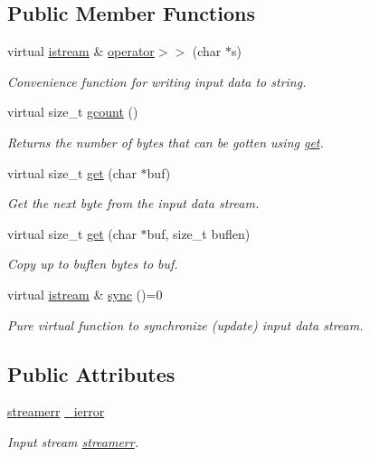 \subsection*{Public Member Functions}
\begin{DoxyCompactItemize}
\item 
virtual \hyperlink{classuio_1_1istream}{istream} \& \hyperlink{classuio_1_1istream_ac98975f13fe7d94de24ce9e9073daaae}{operator$>$$>$} (char $\ast$s)
\begin{DoxyCompactList}\small\item\em Convenience function for writing input data to {\ttfamily string}. \end{DoxyCompactList}\item 
virtual size\+\_\+t \hyperlink{classuio_1_1istream_ac351e3f745e1e10d1d4f999ba097222a}{gcount} ()
\begin{DoxyCompactList}\small\item\em Returns the number of bytes that can be gotten using \hyperlink{classuio_1_1istream_a2cd3af4694dd6680a16221a8e77a344b}{get}. \end{DoxyCompactList}\item 
virtual size\+\_\+t \hyperlink{classuio_1_1istream_a2cd3af4694dd6680a16221a8e77a344b}{get} (char $\ast$buf)
\begin{DoxyCompactList}\small\item\em Get the next byte from the input data stream. \end{DoxyCompactList}\item 
virtual size\+\_\+t \hyperlink{classuio_1_1istream_a12e8ae6afd488b62e216333dbb0935cc}{get} (char $\ast$buf, size\+\_\+t buflen)
\begin{DoxyCompactList}\small\item\em Copy up to {\itshape buflen} bytes to {\itshape buf}. \end{DoxyCompactList}\item 
virtual \hyperlink{classuio_1_1istream}{istream} \& \hyperlink{classuio_1_1istream_a06381289f359f89adb4f26a32b128139}{sync} ()=0
\begin{DoxyCompactList}\small\item\em Pure virtual function to synchronize (update) input data stream. \end{DoxyCompactList}\end{DoxyCompactItemize}
\subsection*{Public Attributes}
\begin{DoxyCompactItemize}
\item 
\hyperlink{classuio_1_1streamerr}{streamerr} \hyperlink{classuio_1_1istream_a31e0fa22aa929184ac32b0cbff9c545d}{\+\_\+ierror}\hypertarget{classuio_1_1istream_a31e0fa22aa929184ac32b0cbff9c545d}{}\label{classuio_1_1istream_a31e0fa22aa929184ac32b0cbff9c545d}

\begin{DoxyCompactList}\small\item\em Input stream \hyperlink{classuio_1_1streamerr}{streamerr}. \end{DoxyCompactList}\end{DoxyCompactItemize}

